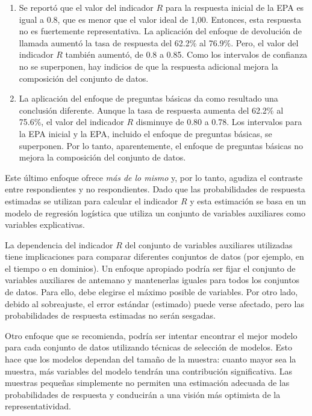 \documentclass[
  10pt,
  spanish,
]{book}
\providecommand{\tightlist}{%
  \setlength{\itemsep}{0pt}\setlength{\parskip}{0pt}}
\begin{document}
\begin{enumerate}
\def\labelenumi{\arabic{enumi}.}
\tightlist
\item
  Se reportó que el valor del indicador \(R\) para la respuesta inicial de la EPA es igual a 0.8, que es menor que el valor ideal de 1,00. Entonces, esta respuesta no es fuertemente representativa. La aplicación del enfoque de devolución de llamada aumentó la
  tasa de respuesta del 62.2\% al 76.9\%. Pero, el valor del indicador \(R\) también aumentó, de 0.8 a 0.85. Como los intervalos de confianza no se superponen, hay indicios de que la respuesta adicional mejora la composición del conjunto de datos.
\item
  La aplicación del enfoque de preguntas básicas da como resultado
  una conclusión diferente. Aunque la tasa de respuesta aumenta del 62.2\% al 75.6\%, el valor del indicador \(R\) disminuye de 0.80 a 0.78. Los intervalos para la EPA inicial y la EPA, incluido el enfoque de preguntas básicas, se superponen. Por lo tanto, aparentemente, el enfoque de preguntas básicas no mejora la composición del conjunto de datos.
\end{enumerate}

Este último enfoque ofrece \emph{más de lo mismo} y, por lo tanto, agudiza el contraste entre respondientes y no respondientes. Dado que las probabilidades de respuesta estimadas se utilizan para calcular
el indicador \(R\) y esta estimación se basa en un modelo de
regresión logística que utiliza un conjunto de variables auxiliares como variables explicativas.

La dependencia del indicador \(R\) del conjunto de variables auxiliares utilizadas tiene implicaciones para comparar diferentes conjuntos de datos (por ejemplo, en el tiempo o en dominios). Un enfoque apropiado podría ser fijar el conjunto de variables auxiliares de antemano y mantenerlas iguales para todos los conjuntos de datos. Para ello, debe elegirse el máximo posible de variables. Por otro lado, debido al sobreajuste, el error estándar (estimado) puede verse
afectado, pero las probabilidades de respuesta estimadas no serán sesgadas.

Otro enfoque que se recomienda, podría ser intentar encontrar el mejor modelo para cada conjunto de datos utilizando técnicas de selección de modelos. Esto hace que los modelos dependan del tamaño de la muestra: cuanto
mayor sea la muestra, más variables del modelo tendrán una contribución significativa. Las muestras pequeñas simplemente no permiten una estimación adecuada de las probabilidades de respuesta y conducirán a una visión más optimista de la representatividad.
\end{document}
